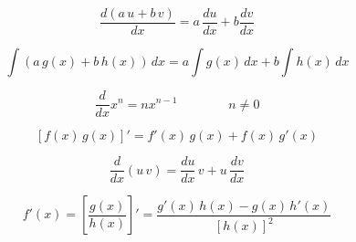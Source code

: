 \[\begin{equation} \frac{d(a \, u+ b \, v)}{dx} = a \, \frac{du}{dx} +b\frac{dv}{dx} \end{equation}\]

\[\begin{equation} \int (a \, g(x) + b \, h(x))\, dx = a \int g(x) \, dx + b \int h(x) \, dx \end{equation}\]

\[\begin{equation} \frac{d}{dx} x^n = n x^{n-1} \qquad\qquad n \neq 0 \end{equation}\]

\[\begin{equation} \left[ f(x) \, g(x) \right]'=f'(x) \, g(x) + f(x) \, g'(x) \end{equation}\]

\[\begin{equation} \dfrac{d}{dx}(u \, v) = \dfrac{du}{dx} \, v + u \, \dfrac{dv}{dx} \end{equation}\]

\[\begin{equation} f'(x) = \left[ \frac{g(x)}{h(x)} \right]' = \frac{g'(x) \, h(x) - g(x) \, h'(x)}{[h(x)]^2} \end{equation}\]


